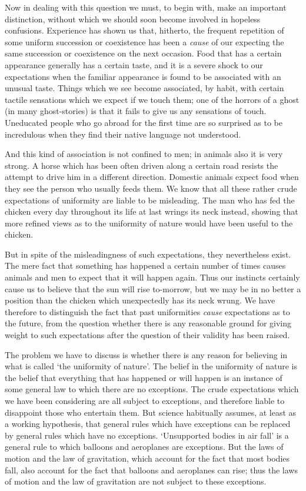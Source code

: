 \documentclass[oneside,letterpaper,12pt]{book}
\begin{document}
Now in dealing with this question we must, to begin with, make an
important distinction, without which we should soon become involved in
hopeless confusions. Experience has shown us that, hitherto, the
frequent repetition of some uniform succession or coexistence has been a
\emph{cause} of our expecting the same succession or coexistence on the
next occasion. Food that has a certain appearance generally has a
certain taste, and it is a severe shock to our expectations when the
familiar appearance is found to be associated with an unusual taste.
Things which we see become associated, by habit, with certain tactile
sensations which we expect if we touch them; one of the horrors of a
ghost (in many ghost-stories) is that it fails to give us any sensations
of touch. Uneducated people who go abroad for the first time are so
surprised as to be incredulous when they find their native language not
understood.

And this kind of association is not confined to men; in animals also it
is very strong. A horse which has been often driven along a certain road
resists the attempt to drive him in a different direction. Domestic
animals expect food when they see the person who usually feeds them. We
know that all these rather crude expectations of uniformity are liable
to be misleading. The man who has fed the chicken every day throughout
its life at last wrings its neck instead, showing that more refined
views as to the uniformity of nature would have been useful to the
chicken.

But in spite of the misleadingness of such expectations, they
nevertheless exist. The mere fact that something has happened a certain
number of times causes animals and men to expect that it will happen
again. Thus our instincts certainly cause us to believe that the sun
will rise to-morrow, but we may be in no better a position than the
chicken which unexpectedly has its neck wrung. We have therefore to
distinguish the fact that past uniformities \emph{cause} expectations as
to the future, from the question whether there is any reasonable ground
for giving weight to such expectations after the question of their
validity has been raised.

The problem we have to discuss is whether there is any reason for
believing in what is called `the uniformity of
nature'. The belief in the uniformity of nature is the
belief that everything that has happened or will happen is an instance
of some general law to which there are no exceptions. The crude
expectations which we have been considering are all subject to
exceptions, and therefore liable to disappoint those who entertain them.
But science habitually assumes, at least as a working hypothesis, that
general rules which have exceptions can be replaced by general rules
which have no exceptions. `Unsupported bodies in air
fall' is a general rule to which balloons and
aeroplanes are exceptions. But the laws of motion and the law of
gravitation, which account for the fact that most bodies fall, also
account for the fact that balloons and aeroplanes can rise; thus the
laws of motion and the law of gravitation are not subject to these
exceptions.
\end{document}
